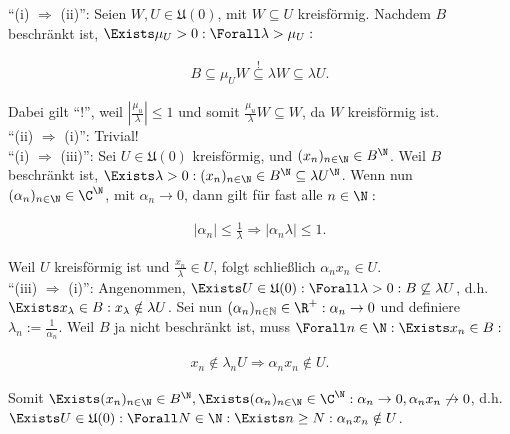 \begin{solution}

\enquote{(i) $\Rightarrow$ (ii)}:
Seien $W, U \in \mathfrak{U}(0)$, mit $W \subseteq U$ kreisförmig.
Nachdem $B$ beschränkt ist, $\Exists \mu_U > 0: \Forall \lambda > \mu_U:$

\begin{align*}
  B
  \subseteq
  \mu_U W
  \stackrel{!}{\subseteq}
  \lambda W
  \subseteq
  \lambda U.
\end{align*}

Dabei gilt \enquote{!}, weil $|\frac{\mu_u}{\lambda}| \leq 1$ und somit $\frac{\mu_u}{\lambda} W \subseteq W$, da $W$ kreisförmig ist. \\

\enquote{(ii) $\Rightarrow$ (i)}:
Trivial! \\

\enquote{(i) $\Rightarrow$ (iii)}:
Sei $U \in \mathfrak{U}(0)$ kreisförmig, und $(x_n)_{n \in \N} \in B^\N$.
Weil $B$ beschränkt ist, $\Exists \lambda > 0: (x_n)_{n \in \N} \in B^\N \subseteq \lambda U^\N$.
Wenn nun $(\alpha_n)_{n \in \N} \in \C^\N$, mit $\alpha_n \to 0$, dann gilt für fast alle $n \in \N:$

\begin{align*}
  |\alpha_n| \leq \frac{1}{\lambda}
  \Rightarrow
  |\alpha_n \lambda| \leq 1.
\end{align*}

Weil $U$ kreisförmig ist und $\frac{x_n}{\lambda} \in U$, folgt schließlich $\alpha_n x_n \in U$. \\

\enquote{(iii) $\Rightarrow$ (i)}:
Angenommen, $\Exists U \in \mathfrak{U}(0): \Forall \lambda > 0: B \not \subseteq \lambda U$, d.h. $\Exists x_\lambda \in B: x_\lambda \notin \lambda U$.
Sei nun $(\alpha_n)_{n\in\mathbb{N}} \in \R^+: \alpha_n \to 0$ und definiere $\lambda_n := \frac{1}{\alpha_n}$.
Weil $B$ ja nicht beschränkt ist, muss $\Forall n \in \N: \Exists x_n \in B:$

\begin{align*}
  x_n \notin \lambda_n U
  \Rightarrow
  \alpha_n x_n \notin U.
\end{align*}

Somit $\Exists (x_n)_{n \in \N} \in B^\N, \Exists (\alpha_n)_{n \in \N} \in \C^\N: \alpha_n \to 0, \alpha_n x_n \not \to 0$, d.h. $\Exists U \in \mathfrak{U}(0): \Forall N \in \N: \Exists n \geq N: \alpha_n x_n \notin U$.

\end{solution}
